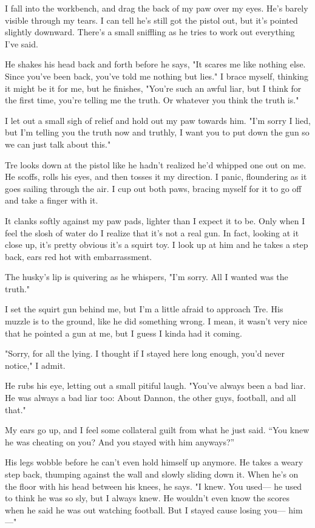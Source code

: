 I fall into the workbench, and drag the back of my paw over my eyes.
He's barely visible through my tears. I can tell he's still got the
pistol out, but it's pointed slightly downward. There's a small
sniffling as he tries to work out everything I've said.

He shakes his head back and forth before he says, "It scares me like
nothing else. Since you've been back, you've told me nothing but lies."
I brace myself, thinking it might be it for me, but he finishes, "You're
such an awful liar, but I think for the first time, you're telling me
the truth. Or whatever you think the truth is."

I let out a small sigh of relief and hold out my paw towards him. "I'm
sorry I lied, but I'm telling you the truth now and truthly, I want you
to put down the gun so we can just talk about this."

Tre looks down at the pistol like he hadn't realized he'd whipped one
out on me. He scoffs, rolls his eyes, and then tosses it my direction. I
panic, floundering as it goes sailing through the air. I cup out both
paws, bracing myself for it to go off and take a finger with it.

It clanks softly against my paw pads, lighter than I expect it to be.
Only when I feel the slosh of water do I realize that it's not a real
gun. In fact, looking at it close up, it's pretty obvious it's a squirt
toy. I look up at him and he takes a step back, ears red hot with
embarrassment.

The husky's lip is quivering as he whispers, "I'm sorry. All I wanted
was the truth."

I set the squirt gun behind me, but I'm a little afraid to approach Tre.
His muzzle is to the ground, like he did something wrong. I mean, it
wasn't very nice that he pointed a gun at me, but I guess I kinda had it
coming.

"Sorry, for all the lying. I thought if I stayed here long enough, you'd
never notice," I admit.

He rubs his eye, letting out a small pitiful laugh. "You've always been
a bad liar. He was always a bad liar too: About Dannon, the other guys,
football, and all that."

My ears go up, and I feel some collateral guilt from what he just said.
``You knew he was cheating on you? And you stayed with him anyways?''

His legs wobble before he can't even hold himself up anymore. He takes a
weary step back, thumping against the wall and slowly sliding down it.
When he's on the floor with his head between his knees, he says. "I
knew. You used--- he used to think he was so sly, but I always knew. He
wouldn't even know the scores when he said he was out watching football.
But I stayed cause losing you--- him---"

